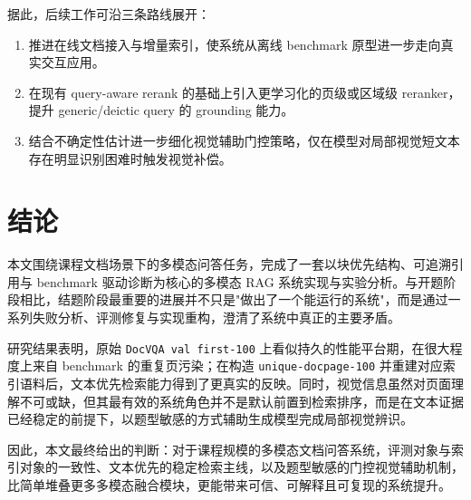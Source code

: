 \documentclass{SYSUReport}
\begin{document}
据此，后续工作可沿三条路线展开：

\begin{enumerate}
    \item 推进在线文档接入与增量索引，使系统从离线 benchmark 原型进一步走向真实交互应用。
    \item 在现有 query-aware rerank 的基础上引入更学习化的页级或区域级 reranker，提升 generic/deictic query 的 grounding 能力。
    \item 结合不确定性估计进一步细化视觉辅助门控策略，仅在模型对局部视觉短文本存在明显识别困难时触发视觉补偿。
\end{enumerate}

\section{结论}

本文围绕课程文档场景下的多模态问答任务，完成了一套以块优先结构、可追溯引用与 benchmark 驱动诊断为核心的多模态 RAG 系统实现与实验分析。与开题阶段相比，结题阶段最重要的进展并不只是"做出了一个能运行的系统"，而是通过一系列失败分析、评测修复与实现重构，澄清了系统中真正的主要矛盾。

研究结果表明，原始 \texttt{DocVQA val first-100} 上看似持久的性能平台期，在很大程度上来自 benchmark 的重复页污染；在构造 \texttt{unique-docpage-100} 并重建对应索引语料后，文本优先检索能力得到了更真实的反映。同时，视觉信息虽然对页面理解不可或缺，但其最有效的系统角色并不是默认前置到检索排序，而是在文本证据已经稳定的前提下，以题型敏感的方式辅助生成模型完成局部视觉辨识。

因此，本文最终给出的判断：对于课程规模的多模态文档问答系统，评测对象与索引对象的一致性、文本优先的稳定检索主线，以及题型敏感的门控视觉辅助机制，比简单堆叠更多多模态融合模块，更能带来可信、可解释且可复现的系统提升。

\newpage
\nocite{*} 


\end{document}
